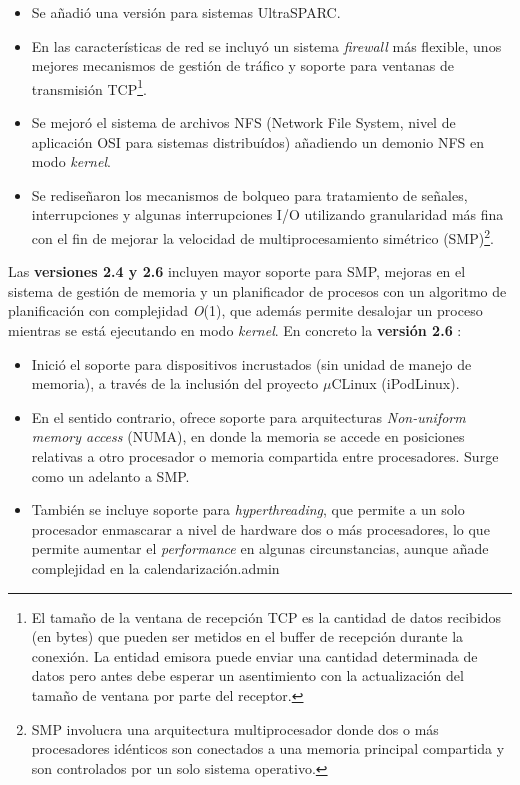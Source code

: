 \documentclass[spanish]{article}
\begin{document}
\begin{itemize}
	\item Se añadió una versión para sistemas UltraSPARC.
	\item En las características de red se incluyó un sistema \textit{firewall} más flexible, unos mejores mecanismos de gestión de tráfico y soporte para ventanas de transmisión TCP\footnote{El tamaño de la ventana de recepción TCP es la cantidad de datos recibidos (en bytes) que pueden ser metidos en el buffer de recepción durante la conexión. La entidad emisora puede enviar una cantidad determinada de datos pero antes debe esperar un asentimiento con la actualización del tamaño de ventana por parte del receptor\cite{TCPWikipedia}.}.
	\item Se mejoró el sistema de archivos NFS (Network File System, nivel de aplicación OSI para sistemas distribuídos) añadiendo un demonio NFS en modo \textit{kernel}.
	\item Se rediseñaron los mecanismos de bolqueo para tratamiento de señales, interrupciones y algunas interrupciones I/O utilizando granularidad más fina con el fin de mejorar la velocidad de multiprocesamiento simétrico (SMP)\footnote{SMP involucra una arquitectura multiprocesador donde dos o más procesadores idénticos son conectados a una memoria principal compartida y son controlados por un solo sistema operativo\cite{SMPWikipedia}.}. 
\end{itemize}
Las \textbf{versiones 2.4 y 2.6} incluyen mayor soporte para SMP, mejoras en el sistema de gestión de memoria y un planificador de procesos con un algoritmo de planificación con complejidad \textit{O}(1), que además permite desalojar un proceso mientras se está ejecutando en modo \textit{kernel}.
En concreto la \textbf{versión 2.6} \cite{Linux2.6Kniggit}:
\begin{itemize}
	\item Inició el soporte para dispositivos incrustados (sin unidad de manejo de memoria), a través de la inclusión del proyecto $\mu$CLinux (iPodLinux).
	\item En el sentido contrario, ofrece soporte para arquitecturas \textit{Non-uniform memory access} (NUMA), en donde la memoria se accede en posiciones relativas a otro procesador o memoria compartida entre procesadores. Surge como un adelanto a SMP.
	\item También se incluye soporte para \textit{hyperthreading}, que permite a un solo procesador enmascarar a nivel de hardware dos o más procesadores, lo que permite aumentar el \textit{performance} en algunas circunstancias, aunque añade complejidad en la calendarización.admin
\end{itemize}
	
\end{document}
